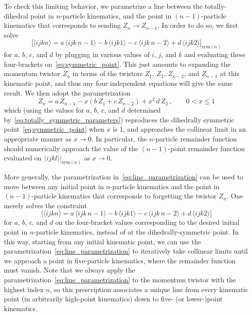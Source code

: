 \documentclass[11pt]{article}
\begin{document}
To check this limiting behavior, we parametrize a line between the totally-dihedral point in $n$-particle kinematics, and the point in $(n{-}1)$-particle kinematics that corresponds to sending $Z_n \to Z_{n-1}$. In order to do so, we first solve
\begin{equation} \label{eq:totally_symmetric_parameters}
\Big[ \langle i j k n \rangle = a\, \langle i j k \, n{-}1 \rangle - b\, \langle i  j  k 1 \rangle - c\, \langle i j k \, n{-}2 \rangle + d\, \langle i j k 2 \rangle \Big]_{\text{sym}(n)} 
\end{equation}
for $a$, $b$, $c$, and $d$ by plugging in various values of $i$, $j$, and $k$ and evaluating these four-brackets on~\eqref{eq:symmetric_point}. This just amounts to expanding the momentum twistor $Z_n$ in terms of the twistors $Z_1$, $Z_2$, $Z_{n-2}$, and $Z_{n-1}$ at this kinematic point, and thus any four independent equations will give the same result. We then adopt the parametrization
\begin{equation} \label{eq:line_parametrization}
Z_n = a\, Z_{n-1} - x (b\, Z_1 + c\, Z_{n-2}) + x^2 \, d \, Z_2 \, , \qquad 0 < x \leq 1
\end{equation}
which (using the values for $a$, $b$, $c$, and $d$ determined by~\eqref{eq:totally_symmetric_parameters}) reproduces the dihedrally symmetric point~\eqref{eq:symmetric_point} when $x$ is 1, and approaches the collinear limit in an appropriate manner as $x \to 0$. In particular, the $n$-particle remainder function should numerically approach the value of the $(n{-}1)$-point remainder function evaluated on $\langle i j k l \rangle \big|_{\text{sym}(n)}$ as $x \to 0$.

More generally, the parametrization in~\eqref{eq:line_parametrization} can be used to move between any initial point in $n$-particle kinematics and the point in $(n{-}1)$-particle kinematics that corresponds to forgetting the twistor $Z_n$. One merely solves the constraint
\begin{equation}
\Big[ \langle i j k n \rangle = a\, \langle i j k \, n{-}1 \rangle - b\, \langle i  j  k 1 \rangle - c\, \langle i j k \, n{-}2 \rangle + d\, \langle i j k 2 \rangle \Big] 
\end{equation}
for $a$, $b$, $c$, and $d$ on the four-bracket values corresponding to the desired initial point in $n$-particle kinematics, instead of at the dihedrally-symmetric point. In this way, starting from any initial kinematic point, we can use the parametrization~\eqref{eq:line_parametrization} to iteratively take collinear limits until we approach a point in five-particle kinematics, where the remainder function must vanish. Note that we always apply the parametrization~\eqref{eq:line_parametrization} to the momentum twistor with the highest index $n$, so this prescription associates a unique line from every kinematic point (in arbitrarily high-point kinematics) down to five- (or lower-)point kinematics.
\end{document}
